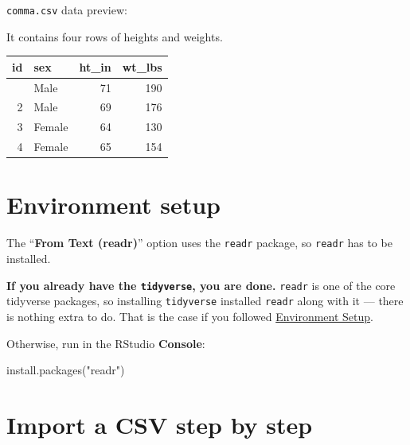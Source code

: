 \documentclass[
  12pt,
  a4paper,
]{scrbook}
\newenvironment{Shaded}{\begin{snugshade}}{\end{snugshade}}
\newcommand{\FunctionTok}[1]{\textcolor[rgb]{0.28,0.35,0.67}{#1}}
\newcommand{\NormalTok}[1]{\textcolor[rgb]{0.00,0.23,0.31}{#1}}
\newcommand{\StringTok}[1]{\textcolor[rgb]{0.13,0.47,0.30}{#1}}
\newcounter{none} %
\theoremstyle{plain}
\theoremstyle{definition}
\theoremstyle{remark}
\begin{document}
\texttt{comma.csv} data preview:

It contains four rows of heights and weights.


{\def\LTcaptype{none} %
\begin{longtable}[]{@{}rlrr@{}}
\toprule\noalign{}
id & sex & ht\_in & wt\_lbs \\
\midrule\noalign{}
\endhead
\bottomrule\noalign{}
\endlastfoot
1 & Male & 71 & 190 \\
2 & Male & 69 & 176 \\
3 & Female & 64 & 130 \\
4 & Female & 65 & 154 \\
\end{longtable}
}

\section{Environment setup}\label{environment-setup-1}

The ``\textbf{From Text (readr)}'' option uses the \texttt{readr}
package, so \texttt{readr} has to be installed.

\textbf{If you already have the \texttt{tidyverse}, you are done.}
\texttt{readr} is one of the core tidyverse packages, so installing
\texttt{tidyverse} installed \texttt{readr} along with it --- there is
nothing extra to do. That is the case if you followed
\hyperref[environment-setup]{Environment Setup}.

Otherwise, run in the RStudio \textbf{Console}:

\begin{Shaded}
\begin{Highlighting}[]
\FunctionTok{install.packages}\NormalTok{(}\StringTok{"readr"}\NormalTok{)}
\end{Highlighting}
\end{Shaded}

\section{Import a CSV step by step}\label{import-a-csv-step-by-step}
\end{document}

